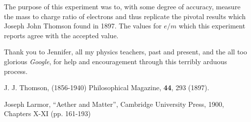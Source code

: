 \documentclass[prb,preprint]{revtex4-1}
\begin{document}
The purpose of this experiment was to, with some degree of accuracy, measure the mass to charge ratio of electrons and thus replicate the pivotal results which Joseph John Thomson found in 1897. The values for $e/m$ which this experiment reports agree with the accepted value.

\newpage

\begin{acknowledgements}
Thank you to Jennifer, all my physics teachers, past and present, and the all too glorious \textit{Google}, for help and encouragement through this terribly arduous process.
\end{acknowledgements}

\begin{thebibliography}{99}

 J. J. Thomson, (1856-1940) Philosophical Magazine, \textbf{44}, 293 (1897).

 Joseph Larmor, ``Aether and Matter'', Cambridge University Press, 1900, Chapters X-XI (pp. 161-193)

\end{thebibliography}
\end{document}
